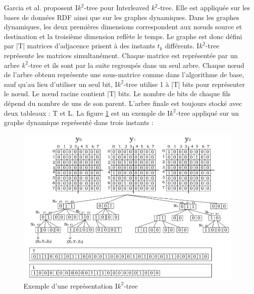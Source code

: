 Garcia et al. \citep{garcia2014interleaved} proposent I$k^2$-tree pour Interleaved $k^2$-tree. Elle est appliquée sur les bases de données RDF ainsi que sur les graphes dynamiques. Dans les graphes dynamiques, les deux premières dimensions correspondent aux nœuds source et destination et la troisième dimension reflète le temps. Le graphe est donc défini par |T| matrices d'adjacence prisent à des instants $t_k$ différents. I$k^2$-tree représente les matrices simultanément. Chaque matrice est représentée par un arbre $k^2$-tree et ils sont par la suite regroupés dans un seul arbre. Chaque nœud de l'arbre obtenu représente une sous-matrice comme dans l'algorithme de base, sauf qu'au lieu d'utiliser un seul bit, I$k^2$-tree utilise 1 à |T| bits pour représenter le nœud. Le nœud racine contient |T| bits. Le nombre de bits de chaque fils dépend du nombre de uns de son parent. L'arbre finale est toujours stocké avec deux tableaux : T et L.
La figure \ref{Ik2-trees} est un exemple de I$k^2$-tree appliqué sur un graphe dynamique représenté dans trois instants \citep{garcia2014interleaved} :

\begin{figure}[H]
\begin{center}
\includegraphics[scale=0.55]{./ressources/image/Ik2-trees.png} 
\end{center}
\caption{Exemple d'une représentation I$k^2$-tree}
\label{Ik2-trees}
\end{figure}

